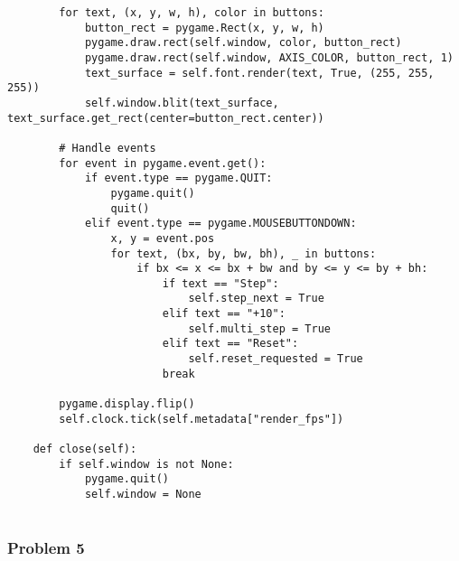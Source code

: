\begin{lstlisting}
        for text, (x, y, w, h), color in buttons:
            button_rect = pygame.Rect(x, y, w, h)
            pygame.draw.rect(self.window, color, button_rect)
            pygame.draw.rect(self.window, AXIS_COLOR, button_rect, 1)
            text_surface = self.font.render(text, True, (255, 255, 255))
            self.window.blit(text_surface, text_surface.get_rect(center=button_rect.center))

        # Handle events
        for event in pygame.event.get():
            if event.type == pygame.QUIT:
                pygame.quit()
                quit()
            elif event.type == pygame.MOUSEBUTTONDOWN:
                x, y = event.pos
                for text, (bx, by, bw, bh), _ in buttons:
                    if bx <= x <= bx + bw and by <= y <= by + bh:
                        if text == "Step":
                            self.step_next = True
                        elif text == "+10":
                            self.multi_step = True
                        elif text == "Reset":
                            self.reset_requested = True
                        break

        pygame.display.flip()
        self.clock.tick(self.metadata["render_fps"])

    def close(self):
        if self.window is not None:
            pygame.quit()
            self.window = None


\end{lstlisting}

\newpage
\clearpage

\subsubsection*{Problem 5}

